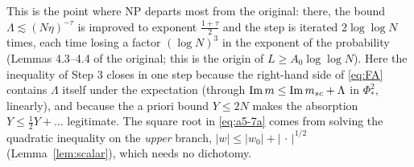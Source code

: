 \begin{remark}
This is the point where NP departs most from the original: there, the bound $\Lambda\lesssim(N\eta)^{-\tau}$ is improved to exponent $\frac{1+\tau}2$ and the step is iterated $2\log\log N$ times, each time losing a factor $(\log N)^{3}$ in the exponent of the probability
(Lemmas 4.3--4.4 of the original; this is the origin of $L\ge A_0\log\log N$). Here the inequality of Step 3 closes in one step because the right-hand side of \eqref{eq:FA} contains $\Lambda$ itself under the expectation (through $\operatorname{Im} m\le\operatorname{Im}m_{sc}+\Lambda$ in $\Phi_*^2$, linearly),
and because the a priori bound $Y\le2N$ makes the absorption $Y\le\frac12Y+\dots$ legitimate. The square root in \eqref{eq:a5-7a} comes from solving the quadratic inequality on the \emph{upper} branch, $|w|\le|w_0|+|\,\cdot\,|^{1/2}$ (Lemma~\ref{lem:scalar}), which needs no dichotomy.
\end{remark}

